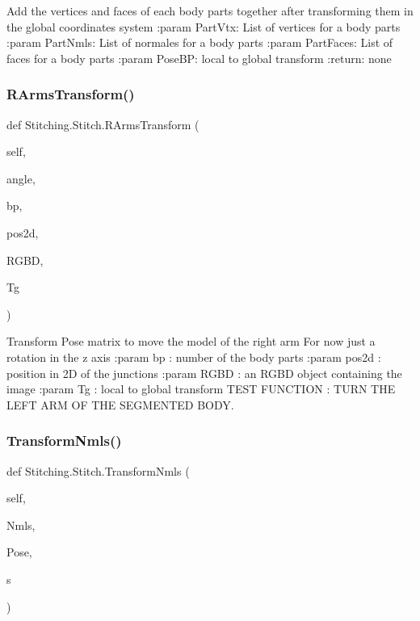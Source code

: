 \begin{DoxyVerb}Add the vertices and faces of each body parts
together after transforming them in the global coordinates system
:param PartVtx: List of vertices for a body parts
:param PartNmls: List of normales for a body parts
:param PartFaces:  List of faces for a body parts
:param PoseBP: local to global transform
:return: none
\end{DoxyVerb}
 \mbox{\label{class_stitching_1_1_stitch_a14624518ed5cbc4422762ff59d3c5bb8}} 
\subsubsection{R\+Arms\+Transform()}
{\footnotesize\ttfamily def Stitching.\+Stitch.\+R\+Arms\+Transform (\begin{DoxyParamCaption}\item[{}]{self,  }\item[{}]{angle,  }\item[{}]{bp,  }\item[{}]{pos2d,  }\item[{}]{R\+G\+BD,  }\item[{}]{Tg }\end{DoxyParamCaption})}

\begin{DoxyVerb}Transform Pose matrix to move the model of the right arm
For now just a rotation in the z axis
:param bp : number of the body parts
:param pos2d : position in 2D of the junctions
:param RGBD : an RGBD object containing the image
:param Tg : local to global transform
TEST FUNCTION : TURN THE LEFT ARM OF THE SEGMENTED BODY.
\end{DoxyVerb}
 \mbox{\label{class_stitching_1_1_stitch_a9df52cb70ec0a02cf93ac0ea9f09706c}} 
\subsubsection{Transform\+Nmls()}
{\footnotesize\ttfamily def Stitching.\+Stitch.\+Transform\+Nmls (\begin{DoxyParamCaption}\item[{}]{self,  }\item[{}]{Nmls,  }\item[{}]{Pose,  }\item[{}]{s }\end{DoxyParamCaption})}

